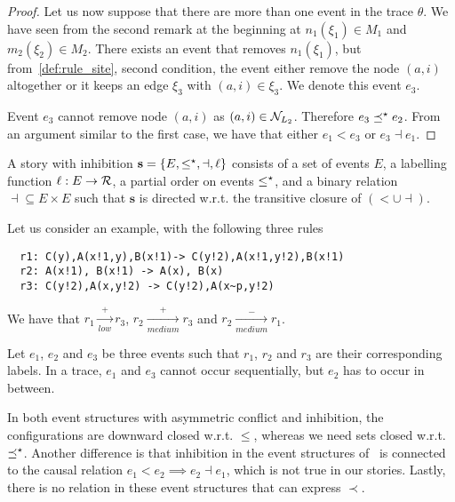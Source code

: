 \begin{proof}
\bigskip

Let us now suppose that there are more than one event in the trace $\theta$. We have seen from the second remark at the beginning at $n_1(\xi_1)\in M_1$ and $m_2(\xi_2)\in M_2$. There exists an event that removes $n_1(\xi_1)$, but from~\autoref{def:rule_site}, second condition, the event either remove the node $(a,i)$ altogether or it keeps an edge $\xi_3$ with $(a,i)\in\xi_3$.
We denote this event $e_3$.

Event $e_3$ cannot remove node $(a,i)$ as $(a,i)\in \mathcal{N}_{L_2}$. Therefore $e_3\preceq^{\star} e_2$. From an argument similar to the first case, we have that either $e_1< e_3$ or $e_3\dashv e_1$.
\end{proof}

\begin{definition}
  A story with inhibition $\textbf{s}=\{E,\leq^{\star},\dashv,\ell\}$ consists of a set of events $E$, a labelling function $\ell:E\to\mathcal{R}$, a partial order on events $\leq^{\star}$, and a binary relation $\dashv\subseteq E\times E$ such that $\textbf{s}$ is directed w.r.t. the transitive closure of $(< \cup \dashv)$.
\end{definition}

\begin{example}
Let us consider an example, with the following three rules
\begin{verbatim}
  r1: C(y),A(x!1,y),B(x!1)-> C(y!2),A(x!1,y!2),B(x!1)
  r2: A(x!1), B(x!1) -> A(x), B(x)
  r3: C(y!2),A(x,y!2) -> C(y!2),A(x~p,y!2)
\end{verbatim}

We have that $r_1\xrightarrow[low]{+} r_3$, $r_2\xrightarrow[medium]{+} r_3$ and $r_2\xrightarrow[medium]{-} r_1$.

Let $e_1$, $e_2$ and $e_3$ be three events such that $r_1$, $r_2$ and $r_3$ are their corresponding labels.
In a trace, $e_1$ and $e_3$ cannot occur sequentially, but $e_2$ has to occur in between.
\end{example}

\begin{remark}
  In both event structures with asymmetric conflict and inhibition, the configurations are downward closed w.r.t. $\leq$, whereas we need sets closed w.r.t. $\preceq^{\star}$. Another difference is that inhibition in the event structures of~\cite{BaldanThesis} is connected to the causal relation $e_1 < e_2 \implies e_2\dashv e_1$, which is not true in our stories. Lastly, there is no relation in these event structures that can express $\prec$.
\end{remark}

